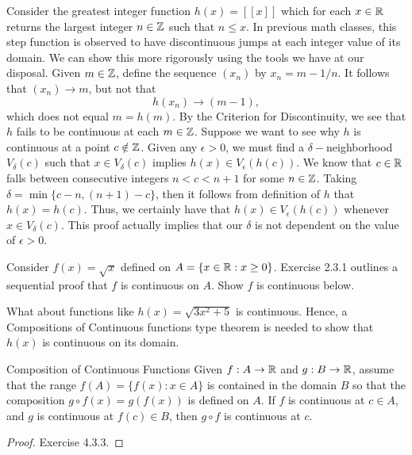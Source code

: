     Consider the greatest integer function \( h(x) = [[x]] \) which for each \( x \in \mathbb{R}  \) returns the largest integer \( n \in \mathbb{Z}  \) such that \( n \leq x  \). In previous math classes, this step function is observed to have discontinuous jumps at each integer value of its domain. We can show this more rigorously using the tools we have at our disposal. Given \( m \in \mathbb{Z}  \), define the sequence \( (x_n)  \) by \( x_n = m -  1/n \). It follows that \( (x_n) \to m \), but not that 
    \[  h(x_n) \to (m-1), \]
    which does not equal \( m = h(m) \). By the Criterion for Discontinuity, we see that \( h \) fails to be continuous at each \( m \in \mathbb{Z}  \). Suppose we want to see why \( h  \) is continuous at a point \( c \notin \mathbb{Z} \). Given any \( \epsilon > 0  \), we must find a \( \delta-\)neighborhood \( V_{\delta}(c) \) such that \( x \in V_{\delta}(c) \) implies \( h(x) \in V_{\epsilon }(h(c)) \). We know that \( c \in \mathbb{R}  \) falls between consecutive integers \( n < c < n+1 \) for some \(  n \in \mathbb{Z}  \). Taking \( \delta = \min \{ c -n , (n+1) - c  \}  \), then it follows from definition of \( h \) that \( h(x) = h(c) \). Thus, we certainly have that \( h(x) \in V_{\epsilon }(h(c)) \) whenever \( x \in V_{\delta}(c) \). This proof actually implies that our \( \delta \) is not dependent on the value of \( \epsilon > 0  \). 

Consider \( f(x) = \sqrt{ x }  \) defined on \( A = \{ x \in \mathbb{R} : x \geq 0 \}  \). Exercise 2.3.1 outlines a sequential proof that \( f  \) is continuous on \( A  \). Show \( f \) is continuous below.

What about functions like \( h(x) = \sqrt{ 3x^2 + 5  }   \) is continuous. Hence, a Compositions of Continuous functions type theorem is needed to show that \( h(x) \) is continuous on its domain.


\begin{theorem}{Composition of Continuous Functions}{}
    Given \( f: A \to \mathbb{R}  \) and \( g: B \to \mathbb{R}  \), assume that the range \( f(A) = \{ f(x) : x \in A  \}  \) is contained in the domain \( B  \) so that the composition \( g \circ f(x) = g(f(x)) \) is defined on \( A  \). If \( f \) is continuous at \( c \in A  \), and \( g  \) is continuous at \( f(c) \in B  \), then \( g \circ f  \) is continuous at \( c  \).

    \end{theorem}

\begin{proof}
Exercise 4.3.3.
\end{proof}




